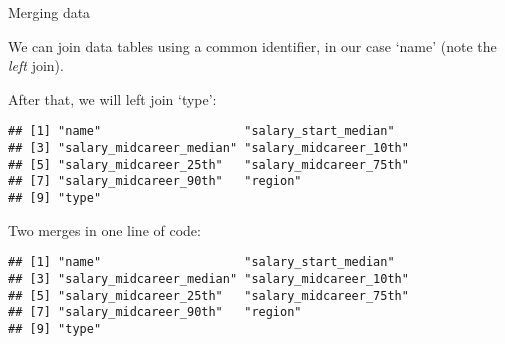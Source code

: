 \documentclass[ignorenonframetext,]{beamer}
\newenvironment{Shaded}{\begin{snugshade}}{\end{snugshade}}
\newcommand{\KeywordTok}[1]{\textcolor[rgb]{0.13,0.29,0.53}{\textbf{#1}}}
\newcommand{\DataTypeTok}[1]{\textcolor[rgb]{0.13,0.29,0.53}{#1}}
\newcommand{\StringTok}[1]{\textcolor[rgb]{0.31,0.60,0.02}{#1}}
\newcommand{\OperatorTok}[1]{\textcolor[rgb]{0.81,0.36,0.00}{\textbf{#1}}}
\newcommand{\NormalTok}[1]{#1}
\begin{document}
\begin{frame}[fragile]{Merging data}

We can join data tables using a common identifier, in our case `name'
(note the \emph{left} join).

\begin{Shaded}
\end{Shaded}

After that, we will left join `type':

\begin{Shaded}
\end{Shaded}

\begin{verbatim}
## [1] "name"                    "salary_start_median"    
## [3] "salary_midcareer_median" "salary_midcareer_10th"  
## [5] "salary_midcareer_25th"   "salary_midcareer_75th"  
## [7] "salary_midcareer_90th"   "region"                 
## [9] "type"
\end{verbatim}

\end{frame}

\begin{frame}[fragile]{Two merges in one line of code:}

\begin{Shaded}
\end{Shaded}

\begin{verbatim}
## [1] "name"                    "salary_start_median"    
## [3] "salary_midcareer_median" "salary_midcareer_10th"  
## [5] "salary_midcareer_25th"   "salary_midcareer_75th"  
## [7] "salary_midcareer_90th"   "region"                 
## [9] "type"
\end{verbatim}

\end{frame}
\end{document}
